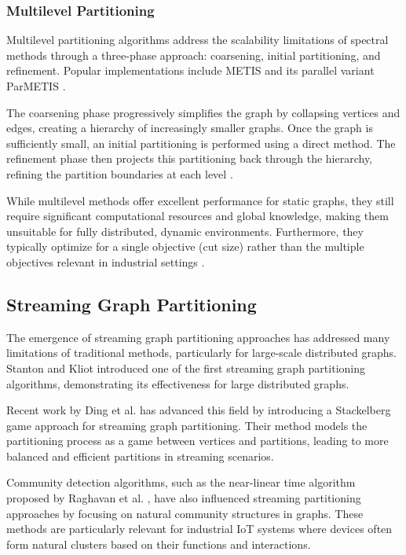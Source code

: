 \subsubsection{Multilevel Partitioning}
Multilevel partitioning algorithms address the scalability limitations of spectral methods through a three-phase approach: coarsening, initial partitioning, and refinement. Popular implementations include METIS \cite{karypis1998fast} and its parallel variant ParMETIS \cite{karypis1998parallel}.

The coarsening phase progressively simplifies the graph by collapsing vertices and edges, creating a hierarchy of increasingly smaller graphs. Once the graph is sufficiently small, an initial partitioning is performed using a direct method. The refinement phase then projects this partitioning back through the hierarchy, refining the partition boundaries at each level \cite{optimization2023b}.

While multilevel methods offer excellent performance for static graphs, they still require significant computational resources and global knowledge, making them unsuitable for fully distributed, dynamic environments. Furthermore, they typically optimize for a single objective (cut size) rather than the multiple objectives relevant in industrial settings \cite{case2023}.

\subsection{Streaming Graph Partitioning}
The emergence of streaming graph partitioning approaches has addressed many limitations of traditional methods, particularly for large-scale distributed graphs. Stanton and Kliot \cite{stanton2012streaming} introduced one of the first streaming graph partitioning algorithms, demonstrating its effectiveness for large distributed graphs.

Recent work by Ding et al. \cite{ding2024play} has advanced this field by introducing a Stackelberg game approach for streaming graph partitioning. Their method models the partitioning process as a game between vertices and partitions, leading to more balanced and efficient partitions in streaming scenarios.

Community detection algorithms, such as the near-linear time algorithm proposed by Raghavan et al. \cite{raghavan2007near}, have also influenced streaming partitioning approaches by focusing on natural community structures in graphs. These methods are particularly relevant for industrial IoT systems where devices often form natural clusters based on their functions and interactions.

